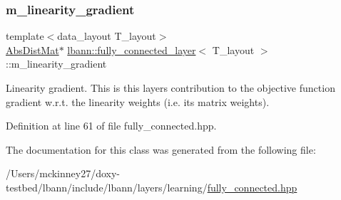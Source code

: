 \subsubsection{\texorpdfstring{m\+\_\+linearity\+\_\+gradient}{m\_linearity\_gradient}}
{\footnotesize\ttfamily template$<$data\+\_\+layout T\+\_\+layout$>$ \\
\hyperlink{base_8hpp_a9a697a504ae84010e7439ffec862b470}{Abs\+Dist\+Mat}$\ast$ \hyperlink{classlbann_1_1fully__connected__layer}{lbann\+::fully\+\_\+connected\+\_\+layer}$<$ T\+\_\+layout $>$\+::m\+\_\+linearity\+\_\+gradient\hspace{0.3cm}{\ttfamily [private]}}

Linearity gradient. This is this layer\textquotesingle{}s contribution to the objective function gradient w.\+r.\+t. the linearity weights (i.\+e. its matrix weights). 

Definition at line 61 of file fully\+\_\+connected.\+hpp.



The documentation for this class was generated from the following file\+:\begin{DoxyCompactItemize}
\item 
/\+Users/mckinney27/doxy-\/testbed/lbann/include/lbann/layers/learning/\hyperlink{fully__connected_8hpp}{fully\+\_\+connected.\+hpp}\end{DoxyCompactItemize}
